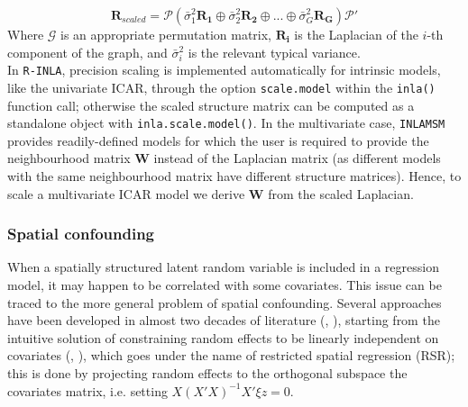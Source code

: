 \documentclass{article}
\begin{document}
$$
\mathbf{R}_{scaled} = \mathcal{P} \left( \bar{\sigma}_1^2 \mathbf{R_1} \oplus \bar{\sigma}_2^2 \mathbf{R_2}
\oplus ... \oplus \bar{\sigma}_G^2 \mathbf{R_G} \right) \mathcal{P'}
$$
Where $\mathcal{G}$ is an appropriate permutation matrix, $\mathbf{R_i}$ is the Laplacian of the $i$-th component of the graph, and $\bar{\sigma}_i^2$ is the relevant typical variance. \\
In \texttt{R-INLA}, precision scaling is implemented automatically for intrinsic models, like the univariate ICAR, through the option \texttt{scale.model} within the \texttt{inla()} function call; otherwise the scaled structure matrix can be computed as a standalone object with \texttt{inla.scale.model()}. In the multivariate case, \texttt{INLAMSM} provides readily-defined models for which the user is required to provide the neighbourhood matrix $\mathbf{W}$ instead of the Laplacian matrix (as different models with the same neighbourhood matrix have different structure matrices). Hence, to scale a multivariate ICAR model we derive  $\mathbf{W}$ from the scaled Laplacian.%






\subsubsection{Spatial confounding}
When a spatially structured latent random variable is included in a regression model, it may happen to be correlated with some covariates. This issue can be traced to the more general problem of spatial confounding. Several approaches have been developed in almost two decades of literature (\cite{Urdangarin23}, \cite{DupontArXiv}), starting from the intuitive solution of constraining random effects to be linearly independent on covariates (\cite {RHZ}, \cite{Hodges}), which goes under the name of restricted spatial regression (RSR); this is done by projecting random effects to the orthogonal subspace the covariates matrix, i.e. setting $X(X'X)^{-1}X' \xi z = 0$.
\end{document}
